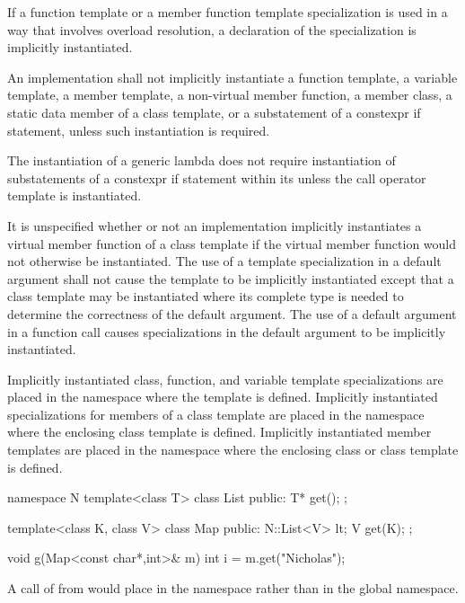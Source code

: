 \pnum
If a function template or a member function template specialization is used in
a way that involves overload resolution,
a declaration of the specialization is implicitly instantiated.

\pnum
An implementation shall not implicitly instantiate a function template,
a variable template,
a member template, a non-virtual member function, a member class, a
static data member of a class template, or a substatement of a constexpr if
statement, unless such instantiation is required.
\begin{note}
The instantiation of a generic lambda
does not require instantiation of
substatements of a constexpr if statement
within its 
unless the call operator template is instantiated.
\end{note}
It is unspecified whether or not an implementation implicitly instantiates a
virtual member function of a class template if the virtual member function would
not otherwise be instantiated.
The use of a template specialization in a default argument
shall not cause the template to be implicitly instantiated except that a
class template may be instantiated where its complete type is needed to determine
the correctness of the default argument.
The use of a default argument in a
function call causes specializations in the default argument to be implicitly
instantiated.

\pnum
Implicitly instantiated class, function, and variable template specializations
are placed in the namespace where the template is defined.
Implicitly instantiated specializations for members of a class template are
placed in the namespace where the enclosing class template is defined.
Implicitly instantiated member templates are placed in the namespace where the
enclosing class or class template is defined.
\begin{example}

\begin{codeblock}
namespace N {
  template<class T> class List {
  public:
    T* get();
  };
}

template<class K, class V> class Map {
public:
  N::List<V> lt;
  V get(K);
};

void g(Map<const char*,int>& m) {
  int i = m.get("Nicholas");
}
\end{codeblock}

A call of
from
would place
in the namespace
rather than in the global namespace.
\end{example}

